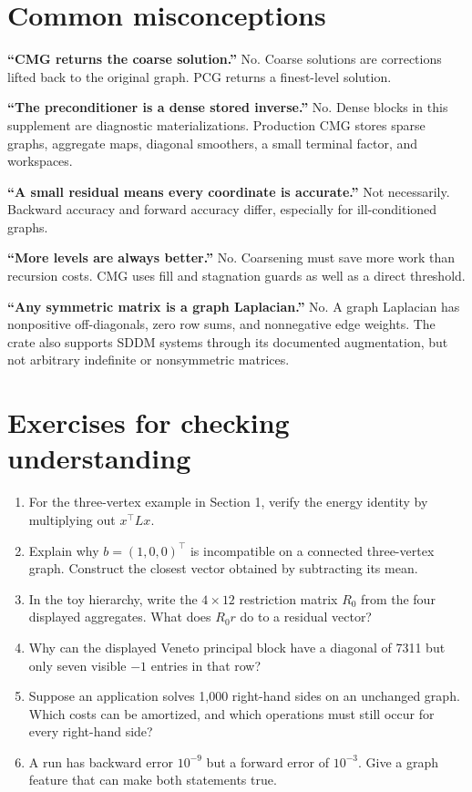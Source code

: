 \documentclass[11pt]{article}
\begin{document}
\section{Common misconceptions}

\noindent\textbf{``CMG returns the coarse solution.''} No.  Coarse solutions are corrections lifted back to the original graph.  PCG returns a finest-level solution.

\medskip\noindent\textbf{``The preconditioner is a dense stored inverse.''} No.  Dense blocks in this supplement are diagnostic materializations.  Production CMG stores sparse graphs, aggregate maps, diagonal smoothers, a small terminal factor, and workspaces.

\medskip\noindent\textbf{``A small residual means every coordinate is accurate.''} Not necessarily.  Backward accuracy and forward accuracy differ, especially for ill-conditioned graphs.

\medskip\noindent\textbf{``More levels are always better.''} No.  Coarsening must save more work than recursion costs.  CMG uses fill and stagnation guards as well as a direct threshold.

\medskip\noindent\textbf{``Any symmetric matrix is a graph Laplacian.''} No.  A graph Laplacian has nonpositive off-diagonals, zero row sums, and nonnegative edge weights.  The crate also supports SDDM systems through its documented augmentation, but not arbitrary indefinite or nonsymmetric matrices.

\section{Exercises for checking understanding}

\begin{enumerate}
  \item For the three-vertex example in Section 1, verify the energy identity by multiplying out $x^\top Lx$.
  \item Explain why $b=(1,0,0)^\top$ is incompatible on a connected three-vertex graph.  Construct the closest vector obtained by subtracting its mean.
  \item In the toy hierarchy, write the $4\times12$ restriction matrix $R_0$ from the four displayed aggregates.  What does $R_0r$ do to a residual vector?
  \item Why can the displayed Veneto principal block have a diagonal of 7311 but only seven visible $-1$ entries in that row?
  \item Suppose an application solves 1,000 right-hand sides on an unchanged graph.  Which costs can be amortized, and which operations must still occur for every right-hand side?
  \item A run has backward error $10^{-9}$ but a forward error of $10^{-3}$.  Give a graph feature that can make both statements true.
\end{enumerate}
\end{document}
